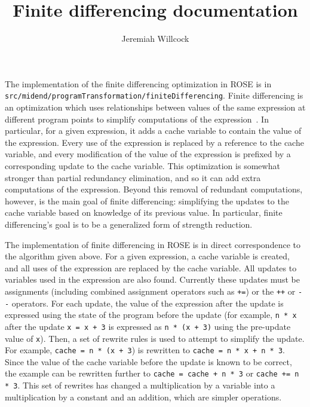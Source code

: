 \documentclass{article}
\begin{document}
\author{Jeremiah Willcock}
\title{Finite differencing documentation}
\maketitle

The implementation of the finite differencing optimization in ROSE is in
\texttt{src/midend/programTransformation/finiteDifferencing}.  Finite
differencing is an optimization which uses relationships between values of
the same expression at different program points to simplify computations of
the expression~\cite{paige_koenig}.  In particular, for a given expression,
it adds a cache variable to contain the value of the expression.  Every use
of the expression is replaced by a reference to the cache variable, and
every modification of the value of the expression is prefixed by a
corresponding update to the cache variable.  This optimization is somewhat
stronger than partial redundancy elimination, and so it can add extra
computations of the expression.  Beyond this removal of redundant
computations, however, is the main goal of finite differencing: simplifying
the updates to the cache variable based on knowledge of its previous value.
In particular, finite differencing's goal is to be a generalized form of
strength reduction.

The implementation of finite differencing in ROSE is in direct
correspondence to the algorithm given above.  For a given expression, a
cache variable is created, and all uses of the expression are replaced by
the cache variable.  All updates to variables used in the expression are
also found.  Currently these updates must be assignments (including
combined assignment operators such as \lstinline{+=}) or the \lstinline{++}
or \lstinline{--} operators.  For each update, the value of the expression
after the update is expressed using the state of the program before the
update (for example, \lstinline{n * x} after the update \lstinline{x = x + 3}
is expressed as \lstinline{n * (x + 3)} using the pre-update value of
\lstinline{x}).  Then, a set of rewrite rules is used to attempt to
simplify the update.  For example, \lstinline{cache = n * (x + 3}) is rewritten to
\lstinline{cache = n * x + n * 3}.  Since the value of the cache variable before
the update is known to be correct, the example can be rewritten further to
\lstinline{cache = cache + n * 3} or \lstinline{cache += n * 3}.  This
set of rewrites has changed a multiplication by a variable into a
multiplication by a constant and an addition, which are simpler operations.
\end{document}
